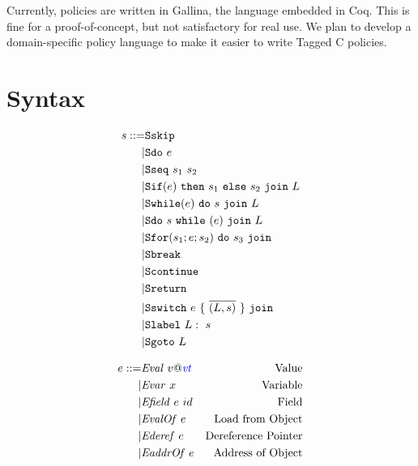 \documentclass{llncs}
\begin{document}
Currently, policies are written in Gallina, the language embedded in Coq. This is fine for a
proof-of-concept, but not satisfactory for real use. We plan to develop a domain-specific policy
language to make it easier to write Tagged C policies.




\appendix

\section{Syntax}

\begin{figure}
  \begin{subfigure}[t]{0.3\textwidth}
    \[\begin{aligned}
    s ::= & \mathtt{Sskip} \\
    | & \mathtt{Sdo} ~ e \\
    | & \mathtt{Sseq} ~ s_1 ~ s_2 \\
    | & \mathtt{Sif}(e) ~ \mathtt{then} ~ s_1 ~ \mathtt{else} ~ s_2 ~ \mathtt{join} ~ L \\
    | & \mathtt{Swhile}(e) ~ \mathtt{do} ~ s ~ \mathtt{join} ~ L \\
    | & \mathtt{Sdo} ~ s ~ \mathtt{while} ~ (e) ~ \mathtt{join} ~ L \\
    | & \mathtt{Sfor}(s_1; e; s_2) ~ \mathtt{do} ~ s_3 ~ \mathtt{join} ~ \\
    | & \mathtt{Sbreak} \\
    | & \mathtt{Scontinue} \\
    | & \mathtt{Sreturn} ~ \\
    | & \mathtt{Sswitch} ~ e ~ \{ ~ \overline{(L,s)} ~ \} ~ \mathtt{join} ~ \\
    | & \mathtt{Slabel} ~ L: ~ s \\
    | & \mathtt{Sgoto} ~ L \\    
    \end{aligned}\]
  \end{subfigure}
  \begin{subfigure}[t]{0.69\textwidth}
    \[\begin{aligned}
    \expr ::= & \val{v}{\vt} & \textnormal{Value} \\
    | & \var{x} & \textnormal{Variable} \\
    | & \field{\expr}{id} & \textnormal{Field} \\
    | & \valof{\expr} & \textnormal{Load from Object} \\
    | & \deref{\expr} & \textnormal{Dereference Pointer} \\
    | & \addrof{\expr} & \textnormal{Address of Object} \\

\end{aligned}\]
\end{subfigure}
\end{figure}
\end{document}
